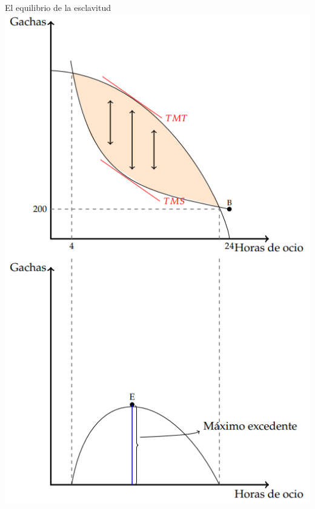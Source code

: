 \documentclass{beamer}
\begin{document}
\begin{frame}{El equilibrio de la esclavitud}
    \centering
    \includegraphics[scale=0.45]{../Figures/C19.8.png}
\end{frame}
\end{document}
